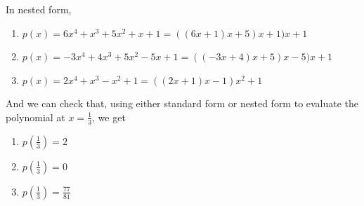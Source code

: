 \documentclass[pdftex,11pt]{article}
\begin{document}
In nested form,
\begin{enumerate}
\item $ p(x) = 6x^4 + x^3 + 5x^2 + x + 1 = ( (6x + 1 ) x + 5 ) x + 1 ) x + 1 $
\item $ p(x) = -3x^4 + 4x^3 + 5x^2 - 5x + 1 = ( ( -3x + 4 ) x + 5 ) x - 5 ) x + 1 $
\item $ p(x) =  2x^4 + x^3 - x^2 + 1 = ( ( 2x + 1) x - 1) x^2 + 1   $
\end{enumerate}

And we can check that, using either standard form or nested form to evaluate the polynomial at $x=\frac13$, 
we get
\begin{enumerate}

\item $ p(\frac{1}{3}) = 2 $\\

\item $ p(\frac{1}{3}) = 0 $\\


\item $ p(\frac{1}{3}) =  \frac{77}{81}   $\\

\end{enumerate}
\end{document}
